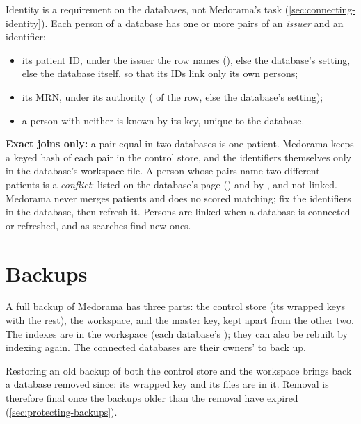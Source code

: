Identity is a requirement on the databases, not Medorama's task
(\cref{sec:connecting-identity}). Each person of a database has one or more pairs of an
\emph{issuer} and an identifier:
\begin{itemize}
\item its patient ID, under the issuer the row names (), else the
  database's  setting, else the database itself, so that its IDs link only its own
  persons;
\item its MRN, under its authority ( of the row, else the database's
  setting);
\item a person with neither is known by its key, unique to the database.
\end{itemize}
\textbf{Exact joins only:} a pair equal in two databases is one patient. Medorama keeps a keyed
hash of each pair in the control store, and the identifiers themselves only in the database's
workspace file. A person whose pairs name two different patients is a \emph{conflict}: listed on
the database's page () and by , and
not linked. Medorama never merges patients and does no scored matching; fix the identifiers in
the database, then refresh it. Persons are linked when a database is connected or refreshed, and
as searches find new ones.

\section{Backups}
\label{sec:administration-backups}

A full backup of Medorama has three parts: the control store (its wrapped keys with the rest),
the workspace, and the master key, kept apart from the other two. The indexes are in the workspace (each
database's ); they can also be rebuilt by indexing again. The connected databases are their owners' to back up.

Restoring an old backup of both the control store and the workspace brings back a database
removed since: its wrapped key and its files are in it. Removal is therefore final once the
backups older than the removal have expired (\cref{sec:protecting-backups}).
